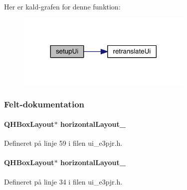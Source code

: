 Her er kald-\/grafen for denne funktion\+:
\nopagebreak
\begin{figure}[H]
\begin{center}
\leavevmode
\includegraphics[width=239pt]{class_ui___e3_p_j_r_acd00a207b203ce4e08e2d4fe020281d2_cgraph}
\end{center}
\end{figure}




\subsubsection{Felt-\/dokumentation}
\paragraph[{\texorpdfstring{horizontal\+Layout\+\_\+2}{horizontalLayout_2}}]{\setlength{\rightskip}{0pt plus 5cm}Q\+H\+Box\+Layout$\ast$ horizontal\+Layout\+\_}\hypertarget{class_ui___e3_p_j_r_a535a43287b7a5605cfc11580d146d3fb}{}\label{class_ui___e3_p_j_r_a535a43287b7a5605cfc11580d146d3fb}


Defineret på linje 59 i filen ui\+\_\+e3pjr.\+h.

\paragraph[{\texorpdfstring{horizontal\+Layout\+\_\+3}{horizontalLayout_3}}]{\setlength{\rightskip}{0pt plus 5cm}Q\+H\+Box\+Layout$\ast$ horizontal\+Layout\+\_}\hypertarget{class_ui___e3_p_j_r_af1b2167ad3027fe2c2328701164e54ec}{}\label{class_ui___e3_p_j_r_af1b2167ad3027fe2c2328701164e54ec}


Defineret på linje 34 i filen ui\+\_\+e3pjr.\+h.

